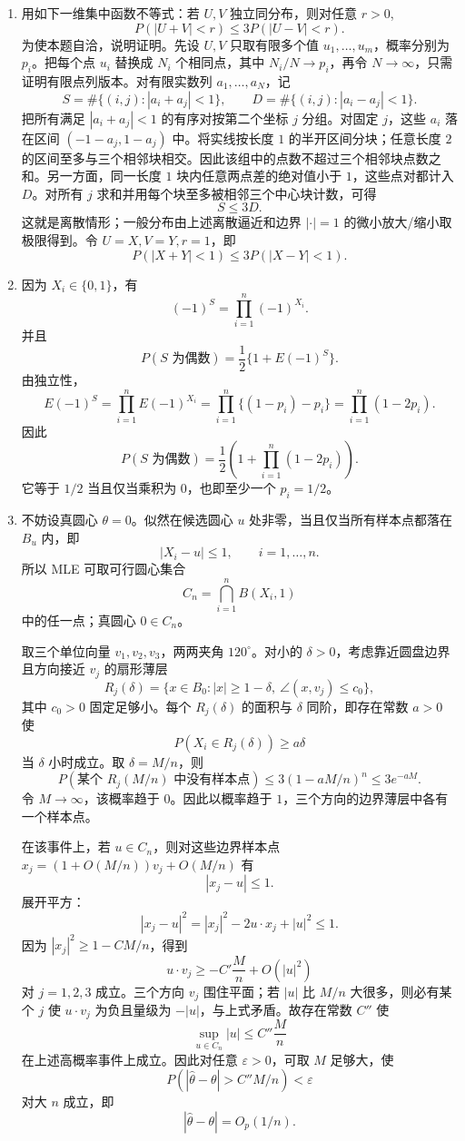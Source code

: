 \documentclass[UTF8,12pt]{ctexart}
\begin{document}
\begin{enumerate}[label=\textbf{\arabic*.},leftmargin=2.2em]
\item 用如下一维集中函数不等式：若 \(U,V\) 独立同分布，则对任意 \(r>0\),
\[
P(|U+V|<r)\le 3P(|U-V|<r).
\]
为使本题自洽，说明证明。先设 \(U,V\) 只取有限多个值 \(u_1,\ldots,u_m\)，概率分别为 \(p_i\)。把每个点 \(u_i\) 替换成 \(N_i\) 个相同点，其中 \(N_i/N\to p_i\)，再令 \(N\to\infty\)，只需证明有限点列版本。对有限实数列 \(a_1,\ldots,a_N\)，记
\[
S=\#\{(i,j): |a_i+a_j|<1\},\qquad
D=\#\{(i,j): |a_i-a_j|<1\}.
\]
把所有满足 \(|a_i+a_j|<1\) 的有序对按第二个坐标 \(j\) 分组。对固定 \(j\)，这些 \(a_i\) 落在区间 \((-1-a_j,1-a_j)\) 中。将实线按长度 \(1\) 的半开区间分块；任意长度 \(2\) 的区间至多与三个相邻块相交。因此该组中的点数不超过三个相邻块点数之和。另一方面，同一长度 \(1\) 块内任意两点差的绝对值小于 \(1\)，这些点对都计入 \(D\)。对所有 \(j\) 求和并用每个块至多被相邻三个中心块计数，可得
\[
S\le 3D.
\]
这就是离散情形；一般分布由上述离散逼近和边界 \(|\cdot|=1\) 的微小放大/缩小取极限得到。令 \(U=X,V=Y,r=1\)，即
\[
P(|X+Y|<1)\le3P(|X-Y|<1).
\]

\item 因为 \(X_i\in\{0,1\}\)，有
\[
(-1)^S=\prod_{i=1}^n(-1)^{X_i}.
\]
并且
\[
P(S\text{ 为偶数})=\frac12\{1+E(-1)^S\}.
\]
由独立性，
\[
E(-1)^S=\prod_{i=1}^n E(-1)^{X_i}
=\prod_{i=1}^n\{(1-p_i)-p_i\}
=\prod_{i=1}^n(1-2p_i).
\]
因此
\[
P(S\text{ 为偶数})
=\frac12\left(1+\prod_{i=1}^n(1-2p_i)\right).
\]
它等于 \(1/2\) 当且仅当乘积为 \(0\)，也即至少一个 \(p_i=1/2\)。

\item 不妨设真圆心 \(\theta=0\)。似然在候选圆心 \(u\) 处非零，当且仅当所有样本点都落在 \(B_u\) 内，即
\[
|X_i-u|\le1,\qquad i=1,\ldots,n.
\]
所以 MLE 可取可行圆心集合
\[
C_n=\bigcap_{i=1}^n B(X_i,1)
\]
中的任一点；真圆心 \(0\in C_n\)。

取三个单位向量 \(v_1,v_2,v_3\)，两两夹角 \(120^\circ\)。对小的 \(\delta>0\)，考虑靠近圆盘边界且方向接近 \(v_j\) 的扇形薄层
\[
R_j(\delta)=\{x\in B_0: |x|\ge1-\delta,\ \angle(x,v_j)\le c_0\},
\]
其中 \(c_0>0\) 固定足够小。每个 \(R_j(\delta)\) 的面积与 \(\delta\) 同阶，即存在常数 \(a>0\) 使
\[
P(X_i\in R_j(\delta))\ge a\delta
\]
当 \(\delta\) 小时成立。取 \(\delta=M/n\)，则
\[
P(\text{某个 }R_j(M/n)\text{ 中没有样本点})
\le 3(1-aM/n)^n\le 3e^{-aM}.
\]
令 \(M\to\infty\)，该概率趋于 \(0\)。因此以概率趋于 \(1\)，三个方向的边界薄层中各有一个样本点。

在该事件上，若 \(u\in C_n\)，则对这些边界样本点 \(x_j=(1+O(M/n))v_j+O(M/n)\) 有
\[
|x_j-u|\le1.
\]
展开平方：
\[
|x_j-u|^2=|x_j|^2-2u\cdot x_j+|u|^2\le1.
\]
因为 \(|x_j|^2\ge 1-CM/n\)，得到
\[
u\cdot v_j\ge -C'\frac{M}{n}+O(|u|^2)
\]
对 \(j=1,2,3\) 成立。三个方向 \(v_j\) 围住平面；若 \(|u|\) 比 \(M/n\) 大很多，则必有某个 \(j\) 使 \(u\cdot v_j\) 为负且量级为 \(-|u|\)，与上式矛盾。故存在常数 \(C''\) 使
\[
\sup_{u\in C_n}|u|\le C''\frac{M}{n}
\]
在上述高概率事件上成立。因此对任意 \(\varepsilon>0\)，可取 \(M\) 足够大，使
\[
P(|\widehat\theta-\theta|>C''M/n)<\varepsilon
\]
对大 \(n\) 成立，即
\[
|\widehat\theta-\theta|=O_p(1/n).
\]


\end{enumerate}
\end{document}
